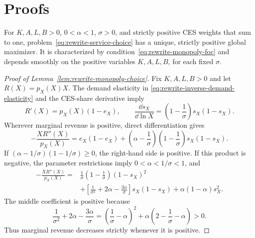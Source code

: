 \section{Proofs}
\label{app:rewrite-proofs}

\begin{lemma}
\label{lem:rewrite-monopoly-choice}
For $K,A,L,B>0$, $0<\alpha<1$, $\sigma>0$, and strictly positive CES weights
that sum to one, problem~\eqref{eq:rewrite-service-choice} has a unique,
strictly positive global maximizer. It is characterized by
condition~\eqref{eq:rewrite-monopoly-foc} and depends smoothly on the positive
variables $K,A,L,B$, for each fixed $\sigma$.
\end{lemma}

\begin{proof}[Proof of Lemma~\ref{lem:rewrite-monopoly-choice}]
Fix \(K,A,L,B>0\) and let \(R(X)=p_X(X)X\).
The demand elasticity in \eqref{eq:rewrite-inverse-demand-elasticity} and the
CES-share derivative imply
\[
 R'(X)=p_X(X)(1-e_X),\qquad
 \frac{\dd s_X}{\dd\ln X}=\left(1-\frac1\sigma\right)s_X(1-s_X).
\]
Wherever marginal revenue is positive, direct differentiation gives
\begin{equation}
 -\frac{XR''(X)}{p_X(X)}
 =e_X(1-e_X)+\left(\alpha-\frac1\sigma\right)
 \left(1-\frac1\sigma\right)s_X(1-s_X).
 \label{eq:rewrite-monopoly-proof-curvature}
\end{equation}
If \((\alpha-1/\sigma)(1-1/\sigma)\geq0\), the right-hand side is positive.
If this product is negative, the parameter restrictions imply
\(0<\alpha<1/\sigma<1\), and
\[
 \begin{aligned}
 -\frac{XR''(X)}{p_X(X)}
 ={}&\frac1\sigma\left(1-\frac1\sigma\right)(1-s_X)^2\\
 &+\left[\frac1{\sigma^2}+2\alpha-\frac{3\alpha}{\sigma}\right]s_X(1-s_X)
 +\alpha(1-\alpha)s_X^2.
 \end{aligned}
\]
The middle coefficient is positive because
\[
 \frac1{\sigma^2}+2\alpha-\frac{3\alpha}{\sigma}
 =\left(\frac1\sigma-\alpha\right)^2
 +\alpha\left(2-\frac1\sigma-\alpha\right)>0.
\]
Thus marginal revenue decreases strictly whenever it is positive.


\end{proof}
